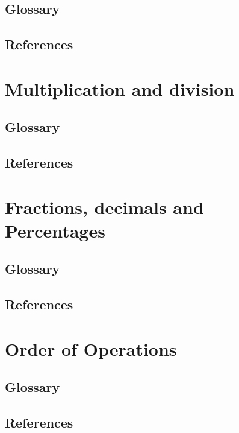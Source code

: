 \documentclass{report}
\begin{document}
\section{Glossary}
\section{References}
\pagebreak


\chapter{Multiplication and division}%
\section{Glossary}
\section{References}
\pagebreak

\chapter{Fractions, decimals and Percentages}%
\section{Glossary}
\section{References}
\pagebreak

\chapter{Order of Operations}%
\section{Glossary}
\section{References}
\pagebreak
\end{document}
